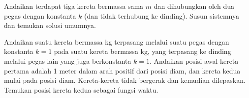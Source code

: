 \begin{exercise}
Andaikan terdapat tiga kereta bermassa sama $m$ dan dihubungkan oleh dua pegas dengan
konstanta $k$ (dan tidak terhubung ke dinding).  Susun sistemnya dan temukan
solusi umumnya.
\end{exercise}

\begin{exercise}
Andaikan suatu kereta bermassa \unit[2]{kg} terpasang melalui suatu pegas dengan
konstanta $k=1$ pada suatu kereta bermassa \unit[3]{kg}, yang
terpasang ke dinding melalui pegas lain yang juga berkonstanta $k=1$.
Andaikan posisi awal kereta pertama adalah 1 meter dalam
arah positif dari posisi diam, dan kereta kedua mulai pada
posisi diam.  Kereta-kereta tidak bergerak dan kemudian dilepaskan.  Temukan
posisi kereta kedua sebagai fungsi waktu.
\end{exercise}

